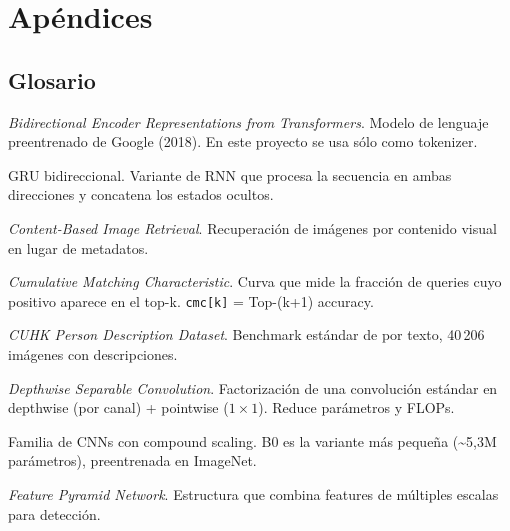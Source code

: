 \chapter{Apéndices}
\label{cap:apendices}

\section{Glosario}

\begin{description}[leftmargin=2.5cm,style=nextline]
  \item[\textbf{BERT}] \emph{Bidirectional Encoder Representations
    from Transformers}. Modelo de lenguaje preentrenado de Google
    (2018). En este proyecto se usa sólo como tokenizer.

  \item[\textbf{BiGRU}] GRU bidireccional. Variante de RNN que
    procesa la secuencia en ambas direcciones y concatena los
    estados ocultos.

  \item[\textbf{CBIR}] \emph{Content-Based Image Retrieval}.
    Recuperación de imágenes por contenido visual en lugar de
    metadatos.

  \item[\textbf{CMC}] \emph{Cumulative Matching Characteristic}.
    Curva que mide la fracción de queries cuyo positivo aparece
    en el top-k. \texttt{cmc[k]} = Top-(k+1) accuracy.

  \item[\textbf{CUHK-PEDES}] \emph{CUHK Person Description Dataset}.
    Benchmark estándar de \reid{} por texto, 40\,206 imágenes con
    descripciones.

  \item[\textbf{DSC}] \emph{Depthwise Separable Convolution}.
    Factorización de una convolución estándar en depthwise
    (por canal) + pointwise ($1 \times 1$). Reduce parámetros y
    FLOPs.

  \item[\textbf{EfficientNet-B0}] Familia de CNNs con compound
    scaling. B0 es la variante más pequeña (\textasciitilde 5,3M
    parámetros), preentrenada en ImageNet.

  \item[\textbf{FPN}] \emph{Feature Pyramid Network}. Estructura
    que combina features de múltiples escalas para detección.


\end{description}

